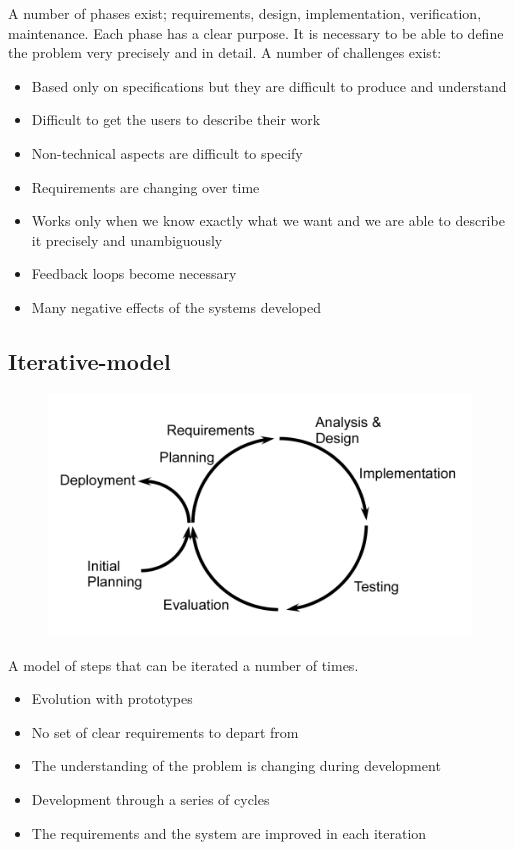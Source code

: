 A number of phases exist; requirements, design, implementation, verification, maintenance. Each phase has a clear purpose. It is necessary to be able to define the problem very precisely and in detail. A number of challenges exist:

\begin{itemize}
    \item Based only on specifications but they are difficult to produce and understand
    \item Difficult to get the users to describe their work
    \item Non-technical aspects are difficult to specify
    \item Requirements are changing over time
    \item Works only when we know exactly what we want and we are able to describe it precisely and unambiguously
    \item Feedback loops become necessary
    \item Many negative effects of the systems developed
\end{itemize}

\subsection{Iterative-model}
\begin{figure}[H]
    \centering
    \includegraphics[width=.4\textwidth]{figures/iterativemodel.png}
\end{figure}
A model of steps that can be iterated a number of times.

\begin{itemize}
    \item Evolution with prototypes
    \item No set of clear requirements to depart from
    \item The understanding of the problem is changing during development
    \item Development through a series of cycles
    \item The requirements and the system are improved in each iteration
\end{itemize}

